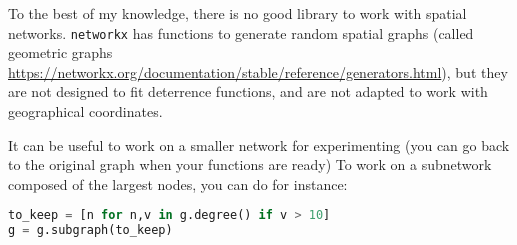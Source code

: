 \documentclass[addpoints]{exam}
\newcommand{\code}[1]{\colorbox{light-gray}{\texttt{#1}}}
\begin{document}
\begin{tcolorbox}[colback=black!5!white,colframe=white!75!black]
To the best of my knowledge, there is no good library to work with spatial networks. \code{networkx} has functions to generate random spatial graphs (called geometric graphs \url{https://networkx.org/documentation/stable/reference/generators.html}), but they are not designed to fit deterrence functions, and are not adapted to work with geographical coordinates.
\end{tcolorbox}
\begin{tcolorbox}
It can be useful to work on a smaller network for experimenting (you can go back to the original graph when your functions are ready) To work on a subnetwork composed of the largest nodes, you can do for instance: 
\begin{lstlisting}[language=Python, caption=Filtering out low degree nodes]
to_keep = [n for n,v in g.degree() if v > 10]
g = g.subgraph(to_keep)
\end{lstlisting}
\end{tcolorbox}
\end{document}
